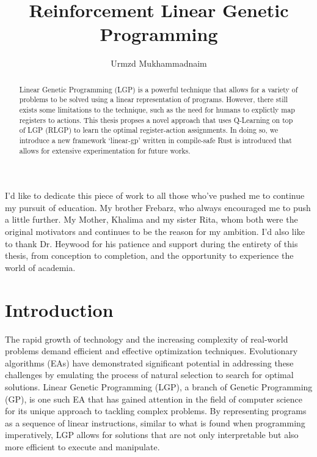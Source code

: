 \documentclass[12pt, final]{dalcsthesis}
\begin{document}
\bcshon
\title{Reinforcement Linear Genetic Programming}
\author{Urmzd Mukhammadnaim}

\reader{}

\nolistoftables
\nolistoffigures

\frontmatter

\nocite{*}

\begin{abstract}
	Linear Genetic Programming (LGP) is a powerful technique that allows for a variety of problems to be solved using a linear representation of programs. However, there still exists some limitations to the technique,
	such as the need for humans to explictly map registers to actions. This thesis propses a novel approach that uses Q-Learning on top of LGP (RLGP) to learn the optimal register-action assignments. In doing so, we introduce a new framework `linear-gp' written in compile-safe Rust is introduced that allows for extensive experimentation for future works.
\end{abstract}

\begin{acknowledgements}
	I'd like to dedicate this piece of work to all those who've pushed me to continue my
	pursuit of education. My brother Frebarz, who always encouraged me to push a little further. My Mother, Khalima and my sister Rita, whom both were the original motivators and continues to be the reason for my ambition. I'd also like to thank Dr. Heywood for
	his patience and support during the entirety of this thesis, from conception to completion, and the opportunity to experience the world of academia.
\end{acknowledgements}

\mainmatter

\chapter{Introduction}
The rapid growth of technology and the increasing complexity of real-world problems demand efficient and effective optimization techniques. Evolutionary algorithms (EAs) have demonstrated significant potential in addressing these challenges by emulating the process of natural selection to search for optimal solutions. Linear Genetic Programming (LGP), a branch of Genetic Programming (GP), is one such EA that has gained attention in the field of computer science for its unique approach to tackling complex problems. By representing programs as a sequence of linear instructions, similar to what is found when programming imperatively, LGP allows for solutions that are not only interpretable but also more efficient to execute and manipulate.
\end{document}
